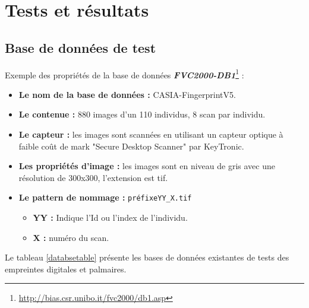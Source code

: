 

\chapter{Tests et résultats}
\label{annexeb}

\section{Base de données de test}
\label{exemplebddtest}
Exemple des propriétés de la base de données \textbf{\textit{FVC2000-DB1}}\footnote{\href{http://bias.csr.unibo.it/fvc2000/db1.asp}{http://bias.csr.unibo.it/fvc2000/db1.asp}} :\\
\begin{itemize}
	\item \textbf{Le nom de la base de données :} CASIA-FingerprintV5.
	\item	\textbf{Le contenue : }880  images d'un 110 individus, 8 scan par individu. 
	\item	\textbf{Le capteur :} les images sont scannées en utilisant un capteur optique à faible coût de mark "Secure Desktop Scanner" par KeyTronic.
	\item	\textbf{Les propriétés d’image : }les images sont en niveau de gris avec une résolution de 300x300, l'extension est tif.
	\item	\textbf{Le pattern de nommage :} \verb|préfixeYY_X.tif|  
\begin{itemize}
 \item \textbf{YY :} Indique l'Id ou l'index de l'individu.
\item \textbf{X :} numéro du scan.
\end{itemize}
\end{itemize}
Le tableau \ref{databsetable} présente les bases de données existantes de tests des empreintes digitales et palmaires.
